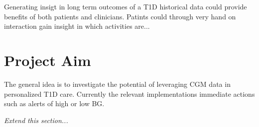 Generating insigt in long term outcomes of a T1D historical data could provide benefits of both patients and clinicians.
Patints could through very hand on interaction gain insight in which activities are...

\section{Project Aim}

The general idea is to investigate the potential of leveraging CGM data in personalized T1D care.
Currently the relevant implementations immediate actions such as alerts of high or low BG.

\textit{Extend this section...}
